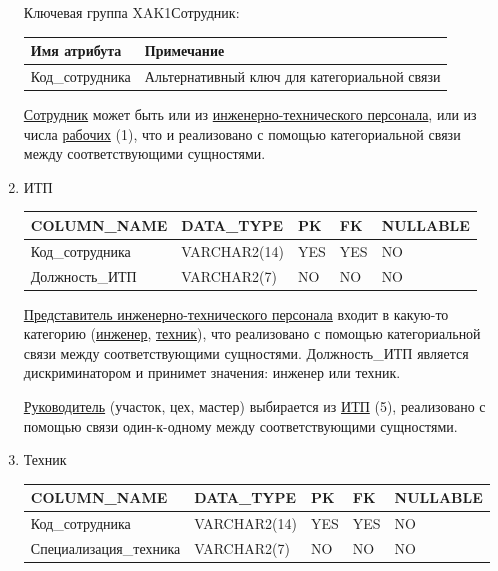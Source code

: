 \begin{enumerate}
\begin{tabular}{|p{7cm}|p{9.3cm}|}
    \end{tabular}

    Ключевая группа XAK1Сотрудник:

    \begin{tabular}{|p{7cm}|p{9.3cm}|} \hline

        {\bf Имя атрибута} & {\bf Примечание} \\ \hline
        Код\_сотрудника & Альтернативный ключ для категориальной связи \\ \hline

    \end{tabular}

    \underline{Сотрудник} может быть или из \underline{инженерно-технического персонала}, или из числа \underline{рабочих} (1), что и реализовано с помощью категориальной связи между соответствующими сущностями.

    \item{ИТП}

    \begin{tabular}{|p{7cm}|p{3cm}|p{1cm}|p{1cm}|p{3cm}|} \hline

        {\bf COLUMN\_NAME} & {\bf DATA\_TYPE} & {\bf PK} & {\bf FK} & {\bf NULLABLE} \\ \hline
        Код\_сотрудника & VARCHAR2(14) & YES & YES & NO \\ \hline
        Должность\_ИТП & VARCHAR2(7) & NO & NO & NO \\ \hline

    \end{tabular}

    \underline{Представитель инженерно-технического персонала} входит в какую-то категорию (\underline{инженер}, \underline{техник}), что реализовано с помощью категориальной связи между соответствующими сущностями.
    Должность\_ИТП является дискриминатором и принимет значения: инженер или техник.

    \underline{Руководитель} (участок, цех, мастер) выбирается из \underline{ИТП} (5), реализовано с помощью связи один-к-одному между соответствующими сущностями.

    \item{Техник}

    \begin{tabular}{|p{7cm}|p{3cm}|p{1cm}|p{1cm}|p{3cm}|} \hline

        {\bf COLUMN\_NAME} & {\bf DATA\_TYPE} & {\bf PK} & {\bf FK} & {\bf NULLABLE} \\ \hline
        Код\_сотрудника & VARCHAR2(14) & YES & YES & NO \\ \hline
        Специализация\_техника & VARCHAR2(7) & NO & NO & NO \\ \hline


\end{tabular}
\end{enumerate}
